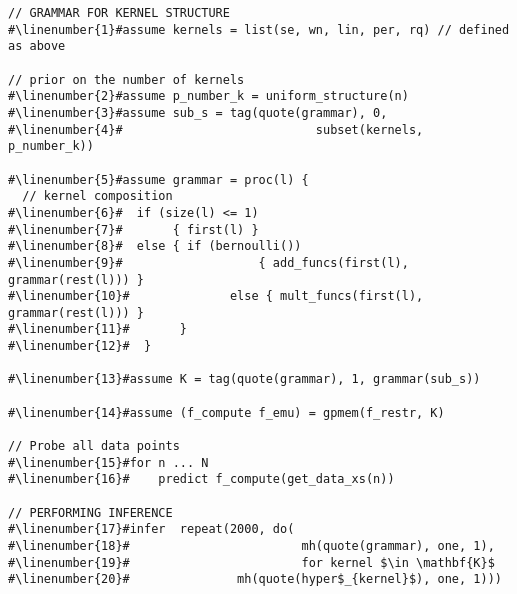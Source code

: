 \begin{mdframed}
\begin{minipage}{\linewidth}
\small
\belowcaptionskip=-10pt
\begin{lstlisting}[mathescape,label=alg:structureVent,basicstyle=\selectfont\ttfamily,numbers=none,escapechar=\#]
// GRAMMAR FOR KERNEL STRUCTURE
#\linenumber{1}#assume kernels = list(se, wn, lin, per, rq) // defined as above

// prior on the number of kernels
#\linenumber{2}#assume p_number_k = uniform_structure(n)
#\linenumber{3}#assume sub_s = tag(quote(grammar), 0,
#\linenumber{4}#                           subset(kernels, p_number_k))

#\linenumber{5}#assume grammar = proc(l) {
  // kernel composition
#\linenumber{6}#  if (size(l) <= 1)
#\linenumber{7}#       { first(l) }
#\linenumber{8}#  else { if (bernoulli()) 
#\linenumber{9}#                   { add_funcs(first(l), grammar(rest(l))) }
#\linenumber{10}#              else { mult_funcs(first(l), grammar(rest(l))) }
#\linenumber{11}#       }
#\linenumber{12}#  }
                          
#\linenumber{13}#assume K = tag(quote(grammar), 1, grammar(sub_s))

#\linenumber{14}#assume (f_compute f_emu) = gpmem(f_restr, K)

// Probe all data points
#\linenumber{15}#for n ... N
#\linenumber{16}#    predict f_compute(get_data_xs(n))

// PERFORMING INFERENCE  
#\linenumber{17}#infer  repeat(2000, do(
#\linenumber{18}#                        mh(quote(grammar), one, 1),
#\linenumber{19}#                        for kernel $\in \mathbf{K}$ 
#\linenumber{20}# 			    mh(quote(hyper$_{kernel}$), one, 1)))
\end{lstlisting}

\end{minipage}
\end{mdframed}

